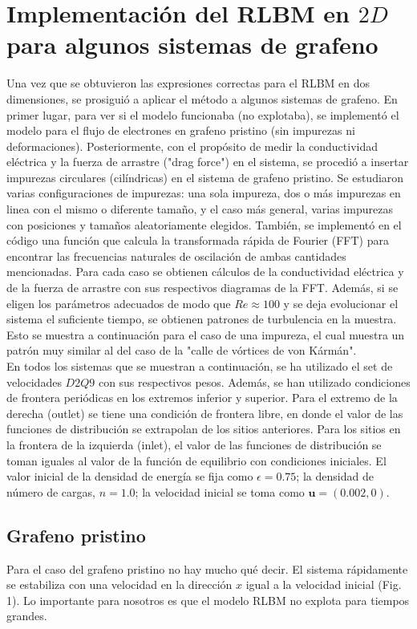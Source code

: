 \documentclass{article}
\begin{document}
 \section{Implementación del RLBM en $2D$ para algunos sistemas de grafeno}
 Una vez que se obtuvieron las expresiones correctas para el RLBM en dos dimensiones, se prosiguió a aplicar el método a algunos sistemas de grafeno. En primer lugar, para ver si el modelo funcionaba (no explotaba), se implementó el modelo para el flujo de electrones en grafeno pristino (sin impurezas ni deformaciones). Posteriormente, con el propósito de medir la conductividad eléctrica y la fuerza de arrastre ("drag force") en el sistema, se procedió a insertar impurezas circulares (cilíndricas) en el sistema de grafeno pristino. Se estudiaron varias configuraciones de impurezas: una sola impureza, dos o más impurezas en linea con el mismo o diferente tamaño, y el caso más general, varias impurezas con posiciones y tamaños aleatoriamente elegidos. También, se implementó en el código una función que calcula la transformada rápida de Fourier (FFT) para encontrar las frecuencias naturales de oscilación de ambas cantidades mencionadas. Para cada caso se obtienen cálculos de la conductividad eléctrica y de la fuerza de arrastre con sus respectivos diagramas de la FFT. Además, si se eligen los parámetros adecuados de modo que $Re\approx 100$ y se deja evolucionar el sistema el suficiente tiempo, se obtienen patrones de turbulencia en la muestra. Esto se muestra a continuación para el caso de una impureza, el cual muestra un patrón muy similar al del caso de la "calle de vórtices de von Kármán".\\
 
 En todos los sistemas que se muestran a continuación, se ha utilizado el set de velocidades $D2Q9$ con sus respectivos pesos. Además, se han utilizado condiciones de frontera periódicas en los extremos inferior y superior. Para el extremo de la derecha (outlet) se tiene una condición de frontera libre, en donde el valor de las funciones de distribución se extrapolan de los sitios anteriores. Para los sitios en la frontera de la izquierda (inlet), el valor de las funciones de distribución se toman iguales al valor de la función de equilibrio con condiciones iniciales. El valor inicial de la densidad de energía se fija como $\epsilon = 0.75$; la densidad de número de cargas, $n=1.0$; la velocidad inicial se toma como $\textbf{u}=(0.002, 0)$. 
 
 \subsection{Grafeno pristino}
 Para el caso del grafeno pristino no hay mucho qué decir. El sistema rápidamente se estabiliza con una velocidad en la dirección $x$ igual a la velocidad inicial (Fig. 1). Lo importante para nosotros es que el modelo RLBM no explota para tiempos grandes.
 
\end{document}
